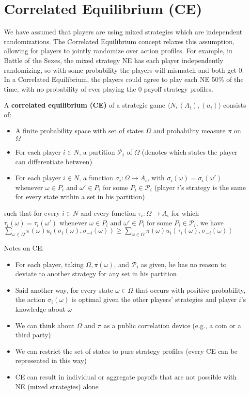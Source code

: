 \documentclass{report}
\begin{document}
\section*{Correlated Equilibrium (CE)}\medskip

We have assumed that players are using mixed strategies which are independent randomizations. The Correlated Equilibrium concept relaxes this assumption, allowing for players to jointly randomize over action profiles. For example, in Battle of the Sexes, the mixed strategy NE has each player independently randomizing, so with some probability the players will mismatch and both get 0. In a Correlated Equilibrium, the players could agree to play each NE 50\% of the time, with no probability of ever playing the 0 payoff strategy profiles. \bigskip \bigskip

A \textbf{correlated equilibrium (CE)} of a strategic game $\langle N,(A_i),(u_i) \rangle$ consists of:
\begin{itemize}
	\item{A finite probability space with set of states $\Omega$ and probability measure $\pi$ on $\Omega$}
	\item{For each player $i \in N$, a partition $\mathcal{P}_i$ of $\Omega$ (denotes which states the player can differentiate between)}
	\item{For each player $i \in N$, a function $\sigma_i: \Omega \rightarrow A_i$, with $\sigma_i(\omega) = \sigma_i(\omega')$ whenever $\omega \in P_i$ and $\omega' \in P_i$ for some $P_i \in \mathcal{P}_i$ (player $i$'s strategy is the same for every state within a set in his partition)}
\end{itemize}
such that for every $i \in N$ and every function $\tau_i: \Omega \rightarrow A_i$ for which $\tau_i(\omega) = \tau_i(\omega')$ whenever $\omega \in P_i$ and $\omega' \in P_i$ for some $P_i \in \mathcal{P}_i$, we have $\displaystyle\sum_{\omega \in \Omega} \pi(\omega) u_i(\sigma_i(\omega), \sigma_{-i}(\omega))\geq \displaystyle\sum_{\omega \in \Omega} \pi(\omega) u_i(\tau_i(\omega), \sigma_{-i}(\omega))$\bigskip 

Notes on CE:
\begin{itemize}
	\item For each player, taking $\Omega, \pi(\omega)$, and $\mathcal{P}_i$ as given, he has no reason to deviate to another strategy for any set in his partition 
	\item Said another way, for every state $\omega \in \Omega$ that occurs with positive probability, the action $\sigma_i(\omega)$ is optimal given the other players' strategies and player $i$'s knowledge about $\omega$
	\item We can think about $\Omega$ and $\pi$ as a public correlation device (e.g., a coin or a third party)
	\item We can restrict the set of states to pure strategy profiles (every CE can be represented in this way)
	\item CE can result in individual or aggregate payoffs that are not possible with NE (mixed strategies) alone
\end{itemize}
\bigskip 
\end{document}
